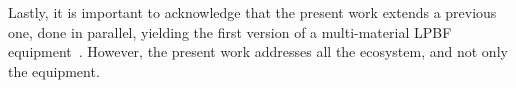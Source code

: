 \begin{ntacknowledgements}
Lastly, it is important to acknowledge that the present work extends a previous
one, done in parallel, yielding the first version of a multi-material LPBF
equipment~\cite{piresMecat}. However, the present work addresses all the
ecosystem, and not only the equipment.

%
%

\end{ntacknowledgements}